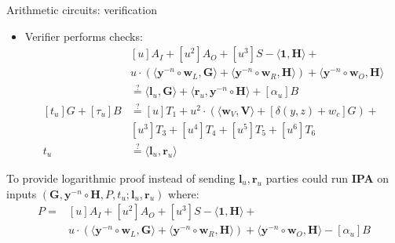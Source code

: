 \documentclass{zkdl-presentation-template}
\begin{document}
    \begin{frame}{Arithmetic circuits: verification}
        \begin{itemize}
            \item Verifier performs checks:
                \begin{equation*}
                    \begin{aligned}
                        &[u]A_I + [u^2]A_O + [u^3]S - \langle \mathbf{1}, \mathbf{H} \rangle + \\
                        &u \cdot (\langle \mathbf{y}^{-n} \circ \mathbf{w}_L, \mathbf{G} \rangle + \langle \mathbf{y}^{-n} \circ \mathbf{w}_R, \mathbf{H} \rangle) + \langle \mathbf{y}^{-n} \circ \mathbf{w}_O, \mathbf{H} \rangle \\
                        &\stackrel{\text{?}}{=} \langle \mathbf{l}_u, \mathbf{G} \rangle + \langle \mathbf{r}_u, \mathbf{y}^{-n} \circ \mathbf{H} \rangle + [\alpha_u]B\\
                        [t_u]G + [\tau_u]B &\stackrel{\text{?}}{=} [u]T_1 + u^2 \cdot (\langle \mathbf{w}_V, \mathbf{V} \rangle + [\delta(y,z) + w_c]G) +\\
                        &[u^3]T_3 + [u^4]T_4 + [u^5]T_5 + [u^6]T_6\\
                        t_u &\stackrel{\text{?}}{=} \langle \mathbf{l}_u, \mathbf{r}_u \rangle
                    \end{aligned}
                \end{equation*}
        \end{itemize}
        \pause
        \begin{remark}
            To provide logarithmic proof instead of sending $\mathbf{l}_u, \mathbf{r}_u$ parties could run \textbf{IPA} on inputs $(\mathbf{G},\mathbf{y}^{-n} \circ \mathbf{H}, P, t_u; \mathbf{l}_u, \mathbf{r}_u)$ where:
            \begin{align*}
                P =& [u]A_I + [u^2]A_O + [u^3]S - \langle \mathbf{1}, \mathbf{H} \rangle +\\
                    &u \cdot (\langle \mathbf{y}^{-n} \circ \mathbf{w}_L, \mathbf{G} \rangle + \langle \mathbf{y}^{-n} \circ \mathbf{w}_R, \mathbf{H} \rangle) + \langle \mathbf{y}^{-n} \circ \mathbf{w}_O, \mathbf{H} \rangle - [\alpha_u]B
            \end{align*}
        \end{remark}
    \end{frame}
\end{document}
